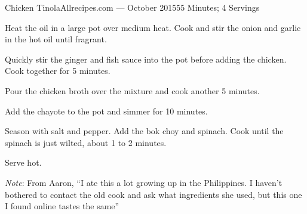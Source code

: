 \documentclass{article}
\begin{document}
\begin{recipe}{Chicken Tinola}{Allrecipes.com --- October 2015}{55 Minutes; 4 Servings}

    Heat the oil in a large pot over medium heat. Cook and stir the onion and
    garlic in the hot oil until fragrant.

    Quickly stir the ginger and fish sauce into the pot before adding the
    chicken. Cook together for 5 minutes.

    Pour the chicken broth over the mixture and cook another 5 minutes.

    Add the chayote to the pot and simmer for 10 minutes.

    Season with salt and pepper. Add the bok choy and spinach. Cook until the
    spinach is just wilted, about 1 to 2 minutes.

    \newstep
    Serve hot.

    \freeform
    \emph{Note}: From Aaron, ``I ate this a lot growing up in the Philippines. I
    haven't bothered to contact the old cook and ask what ingredients she used,
    but this one I found online tastes the same''


\end{recipe}
\end{document}
